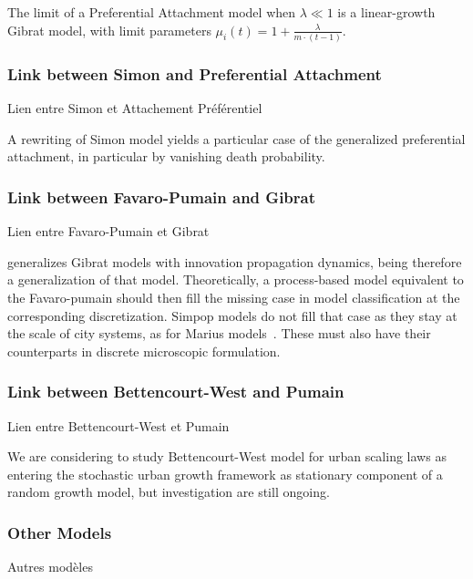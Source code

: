 \begin{lemma}
The limit of a Preferential Attachment model when $\lambda \ll 1$ is a linear-growth Gibrat model, with limit parameters $\mu_i(t)=1+\frac{\lambda}{m\cdot (t-1)}$.
\end{lemma}




\subsubsection{Link between Simon and Preferential Attachment}{Lien entre Simon et Attachement Préférentiel}

A rewriting of Simon model yields a particular case of the generalized preferential attachment, in particular by vanishing death probability.

\subsubsection{Link between Favaro-Pumain and Gibrat}{Lien entre Favaro-Pumain et Gibrat}

\cite{favaro2011gibrat} generalizes Gibrat models with innovation propagation dynamics, being therefore a generalization of that model. Theoretically, a process-based model equivalent to the Favaro-pumain should then fill the missing case in model classification at the corresponding discretization. Simpop models do not fill that case as they stay at the scale of city systems, as for Marius models~\cite{cottineau2014evolution}. These must also have their counterparts in discrete microscopic formulation.

\subsubsection{Link between Bettencourt-West and Pumain}{Lien entre Bettencourt-West et Pumain}

We are considering to study Bettencourt-West model for urban scaling laws \cite{bettencourt2008large} as entering the stochastic urban growth framework as stationary component of a random growth model, but investigation are still ongoing.


\subsubsection{Other Models}{Autres modèles}

